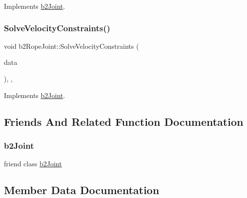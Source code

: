 Implements \mbox{\hyperlink{classb2_joint_af767ac9aa494bd15cdf83dfe3e487d9c}{b2\+Joint}}.

\mbox{\label{classb2_rope_joint_a08bf8f6cffe281a9f58ee469f99bf5b1}} 
\subsubsection{\texorpdfstring{SolveVelocityConstraints()}{SolveVelocityConstraints()}}
{\footnotesize\ttfamily void b2\+Rope\+Joint\+::\+Solve\+Velocity\+Constraints (\begin{DoxyParamCaption}\item[{const \mbox{\hyperlink{structb2_solver_data}{b2\+Solver\+Data}} \&}]{data }\end{DoxyParamCaption})\hspace{0.3cm}{\ttfamily [override]}, {\ttfamily [protected]}, {\ttfamily [virtual]}}



Implements \mbox{\hyperlink{classb2_joint_ad302c8d02efcfe934158de0dc429348d}{b2\+Joint}}.



\subsection{Friends And Related Function Documentation}
\mbox{\label{classb2_rope_joint_a54ade8ed3d794298108d7f4c4e4793fa}} 
\subsubsection{\texorpdfstring{b2Joint}{b2Joint}}
{\footnotesize\ttfamily friend class \mbox{\hyperlink{classb2_joint}{b2\+Joint}}\hspace{0.3cm}{\ttfamily [friend]}}



\subsection{Member Data Documentation}
\mbox{\label{classb2_rope_joint_ac19ae74b5f3c104bc763e99b3986afd6}} 
